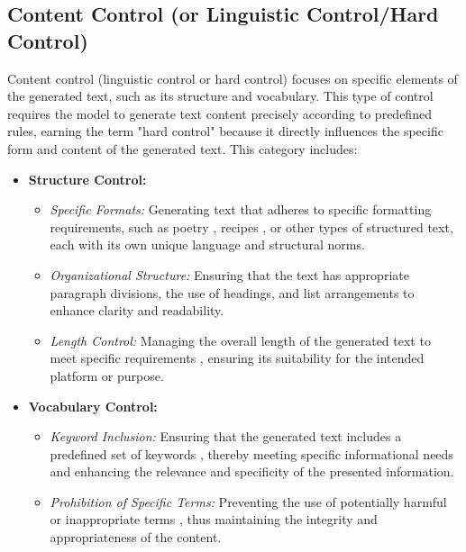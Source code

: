 \documentclass[acmsmall, screen]{acmart}
\begin{document}

\subsection{Content Control (or Linguistic Control/Hard Control)}
Content control (linguistic control or hard control) focuses on specific elements of the generated text, such as its structure and vocabulary. This type of control requires the model to generate text content precisely according to predefined rules, earning the term "hard control" because it directly influences the specific form and content of the generated text. This category includes:

\begin{itemize}
    \item \textbf{Structure Control:}
    \begin{itemize}
        \item \textit{Specific Formats:} Generating text that adheres to specific formatting requirements, such as poetry \cite{yang_acl21_fudge,zou_KDD21_Inverse-Prompting}, recipes \cite{liu_acl22_RecipeWithPlans}, or other types of structured text, each with its own unique language and structural norms.
        \item \textit{Organizational Structure:} Ensuring that the text has appropriate paragraph divisions, the use of headings, and list arrangements \cite{hua_emnlp20_PAIR,lin_nuse21_PlugandBlend} to enhance clarity and readability.
        \item \textit{Length Control:} Managing the overall length of the generated text to meet specific requirements \cite{chai_arxiv22_fast,juseon_acl24_instructcmp,jie_acl24_LengthPrompt}, ensuring its suitability for the intended platform or purpose.
    \end{itemize}
    \item \textbf{Vocabulary Control:}
    \begin{itemize}
        \item \textit{Keyword Inclusion:} Ensuring that the generated text includes a predefined set of keywords \cite{zhang_emnlp20_POINTER,he_emnlp21_CBART}, thereby meeting specific informational needs and enhancing the relevance and specificity of the presented information.
        \item \textit{Prohibition of Specific Terms:} Preventing the use of potentially harmful or inappropriate terms \cite{lu_acl22-neurologic-AFesque}, thus maintaining the integrity and appropriateness of the content.
    \end{itemize}
\end{itemize}
\end{document}
